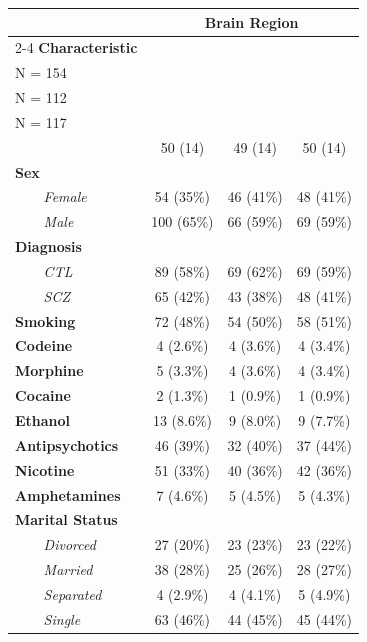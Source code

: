 \begin{table}[t]
\fontsize{12.0pt}{14.0pt}\selectfont
\begin{tabular*}{\linewidth}{@{\extracolsep{\fill}}lccc}
\toprule
 & \multicolumn{3}{c}{\textbf{Brain Region}} \\ 
\cmidrule(lr){2-4}
\textbf{Characteristic} & \shortstack[l]{\textbf{Caudate} \\N = 154}\textsuperscript{\textit{1}} & \shortstack[l]{\textbf{DLPFC} \\N = 112}\textsuperscript{\textit{1}} & \shortstack[l]{\textbf{Hippocampus} \\N = 117}\textsuperscript{\textit{1}} \\ 
\midrule\addlinespace[2.5pt]
{\bfseries Age} & 50 (14) & 49 (14) & 50 (14) \\ 
{\bfseries Sex} &  &  &  \\ 
{\itshape     Female} & 54 (35\%) & 46 (41\%) & 48 (41\%) \\ 
{\itshape     Male} & 100 (65\%) & 66 (59\%) & 69 (59\%) \\ 
{\bfseries Diagnosis} &  &  &  \\ 
{\itshape     CTL} & 89 (58\%) & 69 (62\%) & 69 (59\%) \\ 
{\itshape     SCZ} & 65 (42\%) & 43 (38\%) & 48 (41\%) \\ 
{\bfseries Smoking} & 72 (48\%) & 54 (50\%) & 58 (51\%) \\ 
{\bfseries Codeine} & 4 (2.6\%) & 4 (3.6\%) & 4 (3.4\%) \\ 
{\bfseries Morphine} & 5 (3.3\%) & 4 (3.6\%) & 4 (3.4\%) \\ 
{\bfseries Cocaine} & 2 (1.3\%) & 1 (0.9\%) & 1 (0.9\%) \\ 
{\bfseries Ethanol} & 13 (8.6\%) & 9 (8.0\%) & 9 (7.7\%) \\ 
{\bfseries Antipsychotics} & 46 (39\%) & 32 (40\%) & 37 (44\%) \\ 
{\bfseries Nicotine} & 51 (33\%) & 40 (36\%) & 42 (36\%) \\ 
{\bfseries Amphetamines} & 7 (4.6\%) & 5 (4.5\%) & 5 (4.3\%) \\ 
{\bfseries Marital Status} &  &  &  \\ 
{\itshape     Divorced} & 27 (20\%) & 23 (23\%) & 23 (22\%) \\ 
{\itshape     Married} & 38 (28\%) & 25 (26\%) & 28 (27\%) \\ 
{\itshape     Separated} & 4 (2.9\%) & 4 (4.1\%) & 5 (4.9\%) \\ 
{\itshape     Single} & 63 (46\%) & 44 (45\%) & 45 (44\%) \\ 

\end{tabular*}
\end{table}
